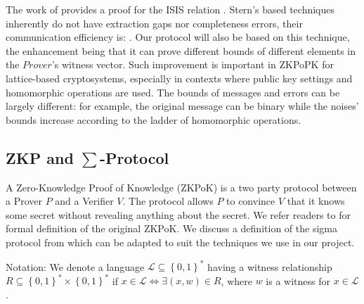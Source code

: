 \begin{description}
  The work of \cite{ling2013improved} provides a proof for the ISIS relation
  .  Stern's based techniques inherently do not have
  extraction gaps nor completeness errors, their communication efficiency is:
  . Our protocol will also be based on this technique, the
  enhancement being that it can prove different bounds of different elements in the
  $Prover$'s witness vector. Such improvement is important in ZKPoPK for
  lattice-based cryptosystems, especially in contexts where public key settings
  and homomorphic operations are used. The bounds of messages and errors can be
  largely different: for example, the original message can be binary while the
  noises' bounds increase according to the ladder of homomorphic operations.

\end{description}


\subsection{ZKP and $\sum$-Protocol}
\label{sub:zkp_and_sum_protocol}
A Zero-Knowledge Proof of Knowledge (ZKPoK) is a two party protocol between a
Prover $P$ and a Verifier $V$. The protocol allows $P$ to convince $V$ that it
knows some secret without revealing anything about the secret. We refer readers
to \cite{bellare1992defining} for formal definition of the original ZKPoK. We
discuss a definition of the sigma protocol from \cite{benhamouda2014better} which can be adapted to suit the techniques we use in our project.

Notation: We denote a language $\mathcal{L} \subseteq \left\{ 0,1 \right\}^* $
having a witness relationship $R \subseteq \left\{ 0,1 \right\}^* \times \left\{
  0,1 \right\}^*$ if $x \in \mathcal{L} \iff \exists (x,w) \in R$, where
$w$ is a witness for $x \in \mathcal{L}$.

